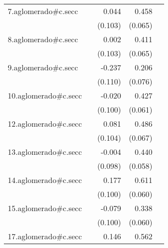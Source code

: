 {\begin{longtable}{l*{4}{D{.}{.}{-1}}}
\addlinespace
7.aglomerado#c.secc&                     &       0.044         &       0.458\sym{***}&                     \\
            &                     &     (0.103)         &     (0.065)         &                     \\
\addlinespace
8.aglomerado#c.secc&                     &       0.002         &       0.411\sym{***}&                     \\
            &                     &     (0.103)         &     (0.065)         &                     \\
\addlinespace
9.aglomerado#c.secc&                     &      -0.237\sym{*}  &       0.206\sym{**} &                     \\
            &                     &     (0.110)         &     (0.076)         &                     \\
\addlinespace
10.aglomerado#c.secc&                     &      -0.020         &       0.427\sym{***}&                     \\
            &                     &     (0.100)         &     (0.061)         &                     \\
\addlinespace
12.aglomerado#c.secc&                     &       0.081         &       0.486\sym{***}&                     \\
            &                     &     (0.104)         &     (0.067)         &                     \\
\addlinespace
13.aglomerado#c.secc&                     &      -0.004         &       0.440\sym{***}&                     \\
            &                     &     (0.098)         &     (0.058)         &                     \\
\addlinespace
14.aglomerado#c.secc&                     &       0.177         &       0.611\sym{***}&                     \\
            &                     &     (0.100)         &     (0.060)         &                     \\
\addlinespace
15.aglomerado#c.secc&                     &      -0.079         &       0.338\sym{***}&                     \\
            &                     &     (0.100)         &     (0.060)         &                     \\
\addlinespace
17.aglomerado#c.secc&                     &       0.146         &       0.562\sym{***}&                     \\

\end{longtable}}
